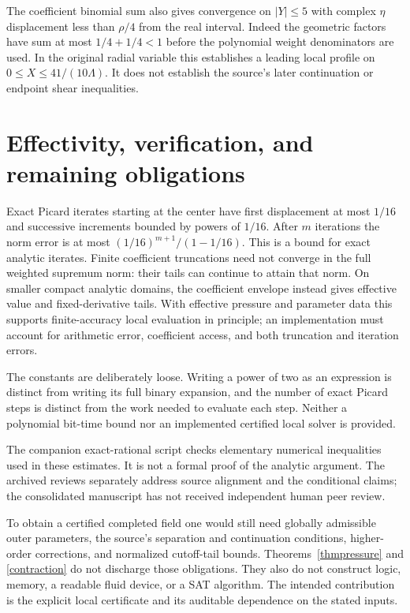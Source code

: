 \documentclass[11pt]{article}
\begin{document}
The coefficient binomial sum also gives convergence on $|Y|\le5$ with
complex $\eta$ displacement less than $\rho/4$ from the real interval.
Indeed the geometric factors have sum at most $1/4+1/4<1$ before
the polynomial weight denominators are used. In the original radial
variable this establishes a leading local profile on
$0\le X\le41/(10\Lambda)$. It does not establish the source's later
continuation or endpoint shear inequalities.

\section{Effectivity, verification, and remaining obligations}
Exact Picard iterates starting at the center have first displacement at
most $1/16$ and successive increments bounded by powers of $1/16$.
After $m$ iterations the norm error is at most
$(1/16)^{m+1}/(1-1/16)$. This is a bound for exact analytic iterates.
Finite coefficient truncations need not converge in the full weighted
supremum norm: their tails can continue to attain that norm.
On smaller compact analytic domains, the coefficient envelope instead
gives effective value and fixed-derivative tails. With effective pressure
and parameter data this supports finite-accuracy local evaluation in
principle; an implementation must account for arithmetic error, coefficient
access, and both truncation and iteration errors.

The constants are deliberately loose. Writing a power of two as an
expression is distinct from writing its full binary expansion, and the
number of exact Picard steps is distinct from the work needed to evaluate
each step. Neither a polynomial bit-time bound nor an implemented certified
local solver is provided.

The companion exact-rational script checks elementary numerical
inequalities used in these estimates. It is not a formal proof of the
analytic argument. The archived reviews separately address source
alignment and the conditional claims; the consolidated manuscript has
not received independent human peer review.

To obtain a certified completed field one would still need globally
admissible outer parameters, the source's separation and continuation
conditions, higher-order corrections, and normalized cutoff-tail bounds.
Theorems~\ref{thmpressure} and \ref{contraction} do not discharge those
obligations. They also do not construct logic, memory, a readable fluid
device, or a SAT algorithm. The intended contribution is the explicit
local certificate and its auditable dependence on the stated inputs.
\end{document}
